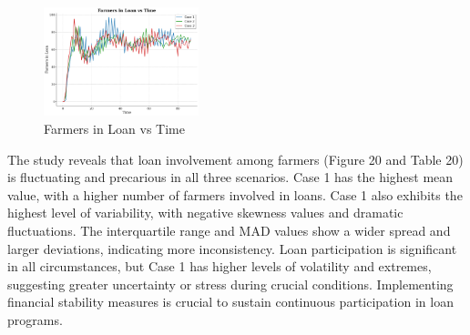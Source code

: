 \documentclass[final,5p,times,twocolumn,authoryear]{elsarticle}
\begin{document}
\begin{figure}[htbp]
    \centering
    \includegraphics[width=0.4\textwidth]{graph_all/plots_crit/farmers_in_loan_vs_time.png}
    \caption{Farmers in Loan vs Time}
    \label{fig:farmers_loan}
\end{figure}
\begin{table}[htbp]
    \centering
    \caption{Farmers in Loan - Statistical Analysis}
\end{table}
The study reveals that loan involvement among farmers (Figure 20 and Table 20) is fluctuating and precarious in all three scenarios. Case 1 has the highest mean value, with a higher number of farmers involved in loans. Case 1 also exhibits the highest level of variability, with negative skewness values and dramatic fluctuations. The interquartile range and MAD values show a wider spread and larger deviations, indicating more inconsistency. Loan participation is significant in all circumstances, but Case 1 has higher levels of volatility and extremes, suggesting greater uncertainty or stress during crucial conditions. Implementing financial stability measures is crucial to sustain continuous participation in loan programs.\\
\end{document}
